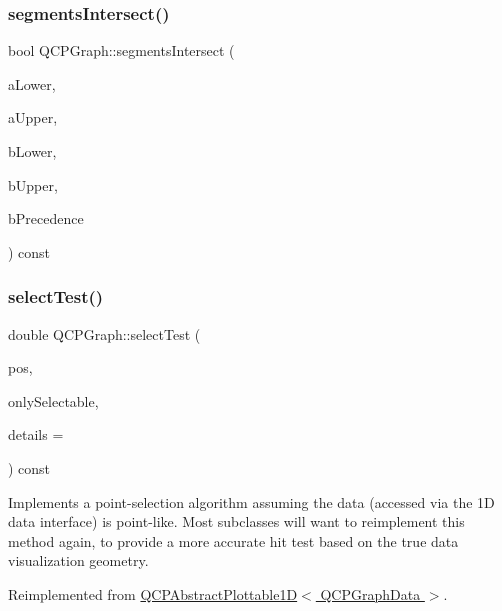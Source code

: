 \subsubsection{\texorpdfstring{segments\+Intersect()}{segmentsIntersect()}}
{\footnotesize\ttfamily bool Q\+C\+P\+Graph\+::segments\+Intersect (\begin{DoxyParamCaption}\item[{double}]{a\+Lower,  }\item[{double}]{a\+Upper,  }\item[{double}]{b\+Lower,  }\item[{double}]{b\+Upper,  }\item[{int \&}]{b\+Precedence }\end{DoxyParamCaption}) const\hspace{0.3cm}{\ttfamily [protected]}}

\mbox{\label{class_q_c_p_graph_a6d669d04462d272c6aa0e5f85846d673}} 
\subsubsection{\texorpdfstring{select\+Test()}{selectTest()}}
{\footnotesize\ttfamily double Q\+C\+P\+Graph\+::select\+Test (\begin{DoxyParamCaption}\item[{const Q\+PointF \&}]{pos,  }\item[{bool}]{only\+Selectable,  }\item[{Q\+Variant $\ast$}]{details = {} }\end{DoxyParamCaption}) const\hspace{0.3cm}{\ttfamily [virtual]}}

Implements a point-\/selection algorithm assuming the data (accessed via the 1D data interface) is point-\/like. Most subclasses will want to reimplement this method again, to provide a more accurate hit test based on the true data visualization geometry.

Reimplemented from \hyperlink{class_q_c_p_abstract_plottable1_d_a4611b43bcb6441b2154eb4f4e0a33db2}{Q\+C\+P\+Abstract\+Plottable1\+D$<$ Q\+C\+P\+Graph\+Data $>$}.

\mbox{\label{class_q_c_p_graph_ab468cd600160f327836aa0644291e64c}} 
